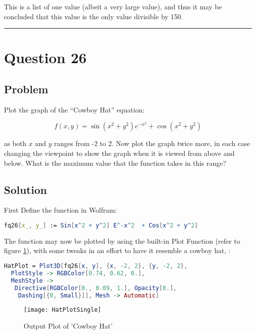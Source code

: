 \documentclass[12pt]{article}
\newenvironment{prob}[1][Problem]{%
	\sffamily \itshape   %
}{\endproof} %
\begin{document}
This is a list of one value (albeit a very large value), and thus it may be concluded that this value is the only value divisible by 150.

\begin{flushright}
{\rule{0.7em}{0.7em}}
\end{flushright}
 
\newpage

\section{Question 26}
\subsection{Problem}
\begin{prob}

  Plot the graph of the  ``Cowboy Hat'' equation:

$$
f\left( x,y \right) = \sin{\left( x^2+ y^2 \right)e^{- x^2} +  \cos{\left( x^2+ y^2 \right)}}
$$
\vspace{0.5 mm}

  as both $x$ and $y$ ranges from -2 to 2. Now plot the graph twice more, in each case changing the viewpoint to show the graph when it is viewed from above and below. What is the maximum value that the function takes in this range?
\end{prob}

\subsection{Solution}
First Define the function in Wolfram:
\begin{lstlisting}[language = Mathematica]
fq26[x_, y_] := Sin[x^2 + y^2] E^-x^2  + Cos[x^2 + y^2]
\end{lstlisting}	

The function may now be plotted by using the built-in Plot Function (refer to  figure \ref{fig:hatplotsingle}), with some tweaks in an effort to have it resemble a cowboy hat, :

\begin{lstlisting}[language = Mathematica]
HatPlot = Plot3D[fq26[x, y], {x, -2, 2}, {y, -2, 2},
  PlotStyle -> RGBColor[0.74, 0.62, 0.],
  MeshStyle -> 
   Directive[RGBColor[0., 0.09, 1.], Opacity[0.], 
    Dashing[{0, Small}]], Mesh -> Automatic]
\end{lstlisting}	
\begin{figure}[h]
	\centering
	\texttt{[image: HatPlotSingle]}
	\caption[]{Output Plot of 'Cowboy Hat'}
	\label{fig:hatplotsingle}
\end{figure}
\end{document}
